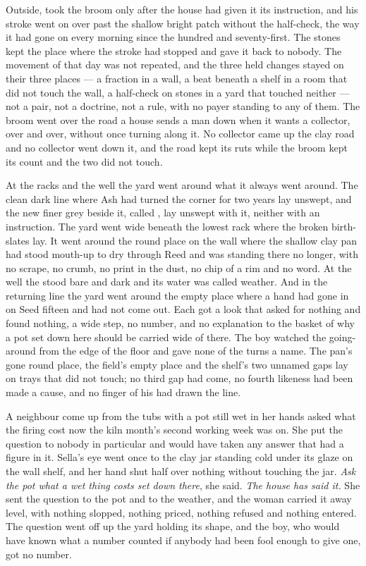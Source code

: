 Outside,  took the broom only after the house had given it its instruction, and his stroke went on over  past the shallow bright patch without the half-check, the way it had gone on every morning since the hundred and seventy-first. The stones kept the place where the stroke had stopped and gave it back to nobody. The movement of that day was not repeated, and the three held changes stayed on their three places — a fraction in a wall, a beat beneath a shelf in a room that did not touch the wall, a half-check on stones in a yard that touched neither — not a pair, not a doctrine, not a rule, with no payer standing to any of them. The broom went over the road a house sends a man down when it wants a collector, over and over, without once turning along it. No collector came up the clay road and no collector went down it, and the road kept its ruts while the broom kept its count and the two did not touch.

\scenebreak

At the racks and the well the yard went around what it always went around. The clean dark line where Ash had turned the corner for two years lay unswept, and the new finer grey beside it, called , lay unswept with it, neither with an instruction. The yard went wide beneath the lowest rack where the broken birth-slates lay. It went around the round place on the wall where the shallow clay pan had stood mouth-up to dry through Reed and was standing there no longer, with no scrape, no crumb, no print in the dust, no chip of a rim and no word. At the well the  stood bare and dark and its water was called weather. And in the returning line the yard went around the empty place where a hand had gone in on Seed fifteen and had not come out. Each got a look that asked for nothing and found nothing, a wide step, no number, and no explanation to the basket of why a pot set down here should be carried wide of there. The boy watched the going-around from the edge of the floor and gave none of the turns a name. The pan's gone round place, the field's empty place and the shelf's two unnamed gaps lay on trays that did not touch; no third gap had come, no fourth likeness had been made a cause, and no finger of his had drawn the line.

A neighbour come up from the tubs with a pot still wet in her hands asked what the firing cost now the kiln month's second working week was on. She put the question to nobody in particular and would have taken any answer that had a figure in it. Sella's eye went once to the clay jar standing cold under its glaze on the wall shelf, and her hand shut half over nothing without touching the jar. \emph{Ask the pot what a wet thing costs set down there}, she said. \emph{The house has said it.} She sent the question to the pot and to the weather, and the woman carried it away level, with nothing slopped, nothing priced, nothing refused and nothing entered. The question went off up the yard holding its shape, and the boy, who would have known what a number counted if anybody had been fool enough to give one, got no number.

